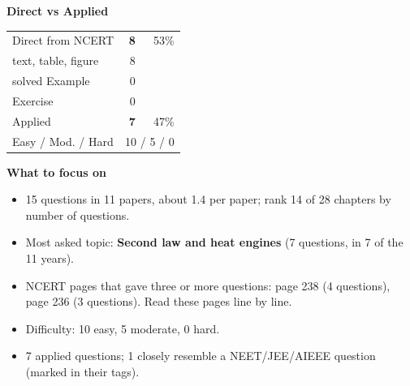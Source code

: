 \begin{minipage}[t]{0.34\linewidth}{\small\textbf{\color{crimson}Direct vs Applied}\par\smallskip
\begin{tabular}{@{}lrr@{}}\toprule
Direct from NCERT & \textbf{8} & 53\%\\
\quad text, table, figure & 8 &\\
\quad solved Example & 0 &\\
\quad Exercise & 0 &\\
Applied & \textbf{7} & 47\%\\\midrule
Easy / Mod. / Hard & \multicolumn{2}{r}{10 / 5 / 0}\\\bottomrule
\end{tabular}}\end{minipage}\hfill
\begin{minipage}[t]{0.63\linewidth}{\small\textbf{\color{crimson}What to focus on}\par\smallskip
\begin{itemize}[leftmargin=1.1em,itemsep=1pt,topsep=0pt]
\item 15 questions in 11 papers, about 1.4 per paper; rank 14 of 28 chapters by number of questions.
\item Most asked topic: \textbf{Second law and heat engines} (7 questions, in 7 of the 11 years).
\item NCERT pages that gave three or more questions: page 238 (4 questions), page 236 (3 questions). Read these pages line by line.
\item Difficulty: 10 easy, 5 moderate, 0 hard.
\item 7 applied questions; 1 closely resemble a NEET/JEE/AIEEE question (marked in their tags).
\end{itemize}}\end{minipage}\par
{}
